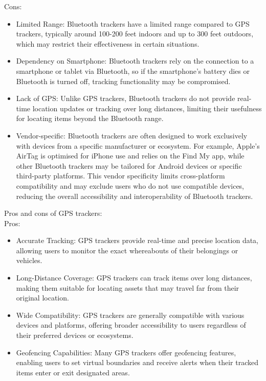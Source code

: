 Cons:
\begin{itemize}
  \item Limited Range: Bluetooth trackers have a limited range compared to \ac{GPS} trackers, typically around 100-200 feet indoors and up to 300 feet outdoors, which may restrict their effectiveness in certain situations.
  \item Dependency on Smartphone: Bluetooth trackers rely on the connection to a smartphone or tablet via Bluetooth, so if the smartphone's battery dies or Bluetooth is turned off, tracking functionality may be compromised.
  \item Lack of \ac{GPS}: Unlike \ac{GPS} trackers, Bluetooth trackers do not provide real-time location updates or tracking over long distances, limiting their usefulness for locating items beyond the Bluetooth range.
  \item Vendor-specific: Bluetooth trackers are often designed to work exclusively with devices from a specific manufacturer or ecosystem. For example, Apple's AirTag is optimised for iPhone use and relies on the Find My app, while other Bluetooth trackers may be tailored for Android devices or specific third-party platforms. This vendor specificity limits cross-platform compatibility and may exclude users who do not use compatible devices, reducing the overall accessibility and interoperability of Bluetooth trackers.
\end{itemize}

Pros and cons of \ac{GPS} trackers:\\
Pros:
\begin{itemize}
  \item Accurate Tracking: \ac{GPS} trackers provide real-time and precise location data, allowing users to monitor the exact whereabouts of their belongings or vehicles.
  \item Long-Distance Coverage: \ac{GPS} trackers can track items over long distances, making them suitable for locating assets that may travel far from their original location.
  \item Wide Compatibility: \ac{GPS} trackers are generally compatible with various devices and platforms, offering broader accessibility to users regardless of their preferred devices or ecosystems.
  \item Geofencing Capabilities: Many \ac{GPS} trackers offer geofencing features, enabling users to set virtual boundaries and receive alerts when their tracked items enter or exit designated areas.
\end{itemize}

